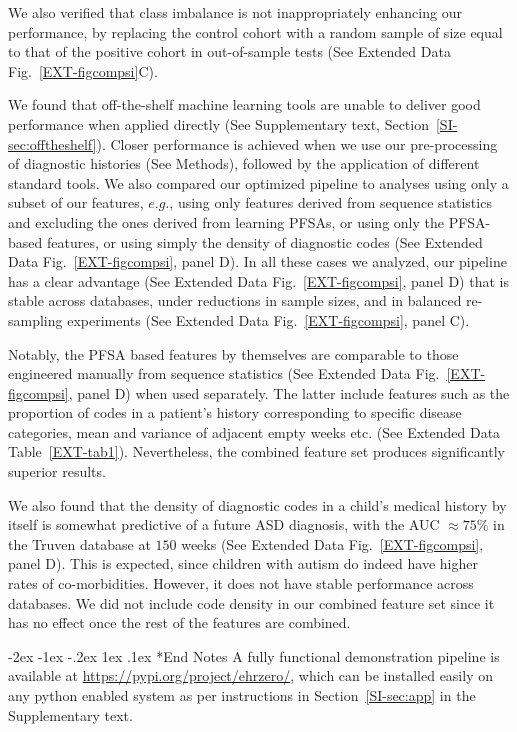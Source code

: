 \documentclass[onecolumn,,10pt]{IEEEtran}
\makeatletter
\renewcommand\section{\@startsection {section}{1}{\z@}%
  {-2ex \@plus -1ex \@minus -.2ex}%
  {1ex \@plus.1ex}%
  {\Large\bfseries\scshape}}
\def\treatment{positive\xspace}
\makeatother
\begin{document}
We also verified that class imbalance is not inappropriately  enhancing our performance, by replacing  the  control cohort with a random sample of size equal to that of the \treatment cohort in out-of-sample tests (See  Extended Data Fig.~\ref{EXT-figcompsi}C).

We found that off-the-shelf machine learning tools are unable to deliver good performance when applied directly (See Supplementary text, Section~\ref{SI-sec:offtheshelf}). Closer performance is achieved  when we use our pre-processing of diagnostic histories (See Methods), followed by the application of  different standard tools. We also compared our optimized pipeline to analyses using only a subset of our features, $e.g.$, using only features derived from sequence statistics and excluding the ones derived from learning PFSAs, or using only the PFSA-based  features, or using simply the density of diagnostic codes (See Extended Data Fig.~\ref{EXT-figcompsi}, panel D). In all these cases we analyzed, our pipeline has a clear advantage (See Extended Data Fig.~\ref{EXT-figcompsi}, panel D) that is stable across databases,  under reductions in sample sizes, and in balanced re-sampling experiments (See Extended Data Fig.~\ref{EXT-figcompsi}, panel C).

Notably, the PFSA based features by themselves  are comparable to those engineered manually from sequence statistics (See Extended Data Fig.~\ref{EXT-figcompsi}, panel D) when used separately. The latter include  features such as the proportion of  codes in a patient's history corresponding to specific  disease categories, mean and variance of adjacent empty weeks etc. (See Extended Data Table~\ref{EXT-tab1}). Nevertheless,  the combined feature set  produces significantly superior results.

We also found that the density of diagnostic codes in a child's medical history by itself is somewhat predictive of a future ASD diagnosis, with the AUC  $\approx 75\%$ in the Truven database at $150$ weeks (See Extended Data Fig.~\ref{EXT-figcompsi}, panel D). This is expected, since children with autism do indeed have higher rates of co-morbidities. However, it does not have stable  performance across databases. We did not include code density in our combined feature set since it has no effect once the rest of the features are combined.

\section*{End Notes}
A fully functional demonstration pipeline is available at \href{https://pypi.org/project/ehrzero/}{https://pypi.org/project/ehrzero/}, which can be installed easily on any python enabled system as per instructions in  Section~\ref{SI-sec:app} in the Supplementary text.
\end{document}

